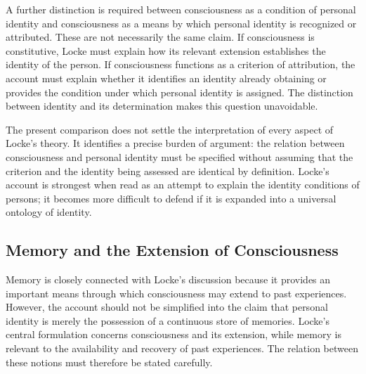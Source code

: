 \label{para:VS.B01.P01.C08.S08.SS07.P006}

A further distinction is required between consciousness
as a condition of personal identity and consciousness
as a means by which personal identity is recognized
or attributed. These are not necessarily the same
claim. If consciousness is constitutive, Locke must
explain how its relevant extension establishes the
identity of the person. If consciousness functions
as a criterion of attribution, the account must
explain whether it identifies an identity already
obtaining or provides the condition under which
personal identity is assigned. The distinction
between identity and its determination makes this
question unavoidable.

\label{para:VS.B01.P01.C08.S08.SS07.P007}

The present comparison does not settle the
interpretation of every aspect of Locke's theory.
It identifies a precise burden of argument: the
relation between consciousness and personal identity
must be specified without assuming that the criterion
and the identity being assessed are identical by
definition. Locke's account is strongest when read
as an attempt to explain the identity conditions
of persons; it becomes more difficult to defend
if it is expanded into a universal ontology of
identity.



\subsection{Memory and the Extension of Consciousness}
\label{subsec:ch08-locke-memory}

\label{para:VS.B01.P01.C08.S08.SS08.P001}

Memory is closely connected with Locke's discussion
because it provides an important means through
which consciousness may extend to past experiences.
However, the account should not be simplified into
the claim that personal identity is merely the
possession of a continuous store of memories.
Locke's central formulation concerns consciousness
and its extension, while memory is relevant to
the availability and recovery of past experiences.
The relation between these notions must therefore
be stated carefully. \cite[II.xxvii.9--10, 13--20]{LockeEssay}

